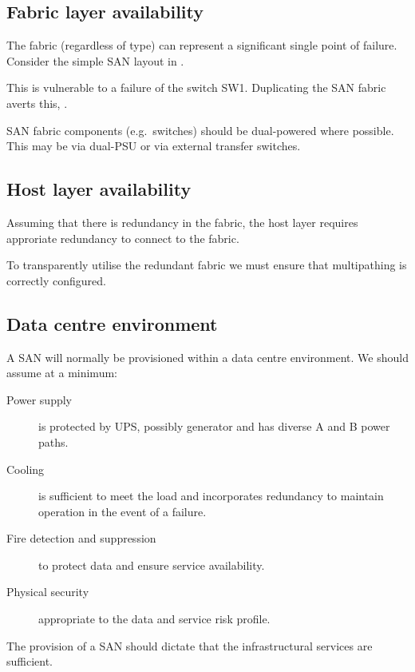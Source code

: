 \subsection{Fabric layer availability}\label{fabric-layer-availability}

The fabric (regardless of type) can represent a significant single point
of failure. Consider the simple SAN layout in .

This is vulnerable to a failure of the switch SW1. Duplicating the SAN
fabric averts this, .

SAN fabric components (e.g.~switches) should be dual-powered where
possible. This may be via dual-PSU or via external transfer switches.

\subsection{Host layer availability}\label{host-layer-availability}

Assuming that there is redundancy in the fabric, the host layer requires
approriate redundancy to connect to the fabric.

To transparently utilise the redundant fabric we must ensure that
multipathing is correctly configured.

\subsection{Data centre environment}\label{data-centre-environment}

A SAN will normally be provisioned within a data centre environment. We
should assume at a minimum:

\begin{description}
\item[Power supply]
is protected by UPS, possibly generator and has diverse A and B power
paths.
\item[Cooling]
is sufficient to meet the load and incorporates redundancy to maintain
operation in the event of a failure.
\item[Fire detection and suppression]
to protect data and ensure service availability.
\item[Physical security]
appropriate to the data and service risk profile.
\end{description}

The provision of a SAN should dictate that the infrastructural services
are sufficient.
